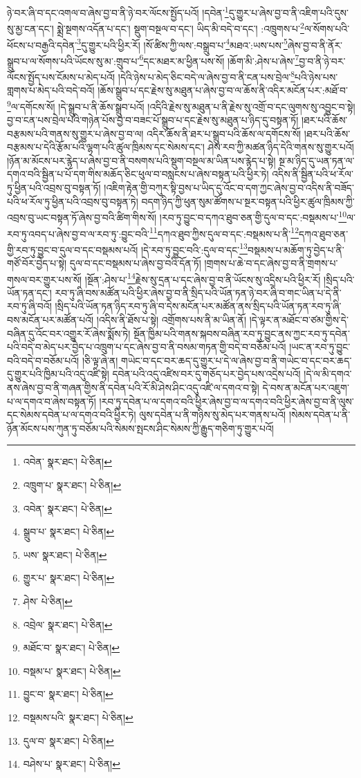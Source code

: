 ཉེ་བར་ཞི་བ་དང་འགལ་བ་ཞེས་བྱ་བ་ནི་ཉེ་བར་ལོངས་སྤྱོད་པའོ། །དབེན་\footnote{འབེན་  སྣར་ཐང་།  པེ་ཅིན། }དུ་གྱུར་པ་ཞེས་བྱ་བ་ནི་འཇིག་པའི་དུས་སུ་མྱ་ངན་དང་། སྨྲེ་སྔགས་འདོན་པ་དང་། སྡུག་བསྔལ་བ་དང་། ཡིད་མི་བདེ་བ་དང་། :འཁྲུགས་པ་\footnote{འཁྲུག་པ་  སྣར་ཐང་།  པེ་ཅིན། }ལ་སོགས་པའི་ཕོངས་པ་བརྒྱའི་དབེན་\footnote{འབེན་  སྣར་ཐང་།  པེ་ཅིན། }དུ་གྱུར་པའི་ཕྱིར་རོ། །སོ་ཚིས་ཀྱི་ལས་:བསྒྲུབ་པ་\footnote{སྒྲུབ་པ་  སྣར་ཐང་།  པེ་ཅིན། }མཐའ་:ཡས་པས་\footnote{ཡས་  སྣར་ཐང་།  པེ་ཅིན། }ཞེས་བྱ་བ་ནི་ནོར་སྒྲུབ་པ་ལ་སོགས་པའི་ཡོངས་སུ་མ་:གྲུབ་པ་\footnote{གྱུར་པ་  སྣར་ཐང་།  པེ་ཅིན། }དང་མཐར་མ་ཕྱིན་པས་སོ། །ཆོག་མི་:ཤེས་པ་ཞེས་\footnote{ཤེས་  པེ་ཅིན། }བྱ་བ་ནི་ཉེ་བར་ལོངས་སྤྱོད་པས་ངོམས་པ་མེད་པའོ། །དེའི་ཉེས་པ་མེད་ཅིང་བདེ་ལ་ཞེས་བྱ་བ་ནི་ངན་པས་བྲེལ་\footnote{འབྲེལ་  སྣར་ཐང་།  པེ་ཅིན། }པའི་ཉེས་པས་གླགས་པ་མེད་པའི་བདེ་བའོ། །ཆོས་སྒྲུབ་པ་དང་རྗེས་སུ་མཐུན་པ་ཞེས་བྱ་བ་ལ་ཆོས་ནི་འདིར་མངོན་པར་:མཐོ་བ་\footnote{མཐོང་བ་  སྣར་ཐང་།  པེ་ཅིན། }ལ་དགོངས་སོ། །དེ་སྒྲུབ་པ་ནི་ཆོས་སྒྲུབ་པའོ། །འདིའི་རྗེས་སུ་མཐུན་པ་ནི་རྗེས་སུ་འགྲོ་བ་དང་ལུགས་སུ་འབྱུང་བ་སྟེ། བྱ་བ་ངན་པས་བྲེལ་པའི་གཉེན་པོས་བྱ་བ་བཟང་པོ་སྒྲུབ་པ་དང་རྗེས་སུ་མཐུན་པ་ཉིད་དུ་བསྟན་ཏོ། །ཐར་པའི་ཆོས་བརྩམས་པའི་གནས་སུ་གྱུར་པ་ཞེས་བྱ་བ་ལ། འདིར་ཆོས་ནི་ཐར་པ་སྒྲུབ་པའི་ཆོས་ལ་དགོངས་སོ། །ཐར་པའི་ཆོས་བརྩམས་པ་དེའི་རྩོམ་པའི་ལྷག་པའི་ཚུལ་ཁྲིམས་དང་སེམས་དང་། ཤེས་རབ་ཀྱི་མཚན་ཉིད་དེའི་གནས་སུ་གྱུར་པའོ། །ཉོན་མ་མོངས་པར་རྙེད་པ་ཞེས་བྱ་བ་ནི་བསགས་པའི་སྡུག་བསྔལ་མ་ཡིན་པས་རྙེད་པ་སྟེ། སྔ་མ་ཉིད་དུ་ཡན་ཏན་ལ་དགའ་བའི་སྦྱིན་པ་པོ་དག་གིས་མཆོད་ཅིང་ཕུལ་བ་བསླངས་པ་ཞེས་བསྟན་པའི་ཕྱིར་ཏེ། འདིས་ནི་སྦྱིན་པའི་ཕ་རོལ་ཏུ་ཕྱིན་པའི་འབྲས་བུ་བསྟན་ཏོ། །འཇིག་རྟེན་གྱི་བཀུར་སྟི་བྱས་པ་ཡིད་དུ་འོང་བ་དག་ཀྱང་ཞེས་བྱ་བ་འདིས་ནི་བཟོད་པའི་ཕ་རོལ་ཏུ་ཕྱིན་པའི་འབྲས་བུ་བསྟན་ཏེ། བདག་ཉིད་ཀྱི་ཕུན་སུམ་ཚོགས་པ་སྔར་བསྟན་པའི་ཕྱིར་ཚུལ་ཁྲིམས་ཀྱི་འབྲས་བུ་ཡང་བསྟན་ཏོ་ཞེས་བྱ་བའི་ཚིག་གིས་སོ། །རབ་ཏུ་བྱུང་བ་དཀའ་ཐུབ་ཅན་གྱི་དུལ་བ་དང་:བསྡམས་པ་\footnote{བསྡམ་པ་  སྣར་ཐང་།  པེ་ཅིན། }ལ་རབ་ཏུ་འབད་པ་ཞེས་བྱ་བ་ལ་རབ་ཏུ་:བྱུང་བའི་\footnote{བྱུང་བ་  སྣར་ཐང་།  པེ་ཅིན། }དཀའ་ཐུབ་ཀྱིས་དུལ་བ་དང་:བསྡམས་པ་ནི་\footnote{བསྡམས་པའི་  སྣར་ཐང་།  པེ་ཅིན། }དཀའ་ཐུབ་ཅན་གྱི་རབ་ཏུ་བྱུང་བ་དུལ་བ་དང་བསྡམས་པའོ། །དེ་རབ་ཏུ་བྱུང་བའི་:དུལ་བ་དང་\footnote{དུལ་བ་  སྣར་ཐང་།  པེ་ཅིན། }བསྡམས་པ་མཆོག་ཏུ་བྱེད་པ་ནི་གཙོ་བོར་བྱེད་པ་སྟེ། དུལ་བ་དང་བསྡམས་པ་ཞེས་བྱ་བའི་དོན་ཏོ། །གྲགས་པ་ཆེ་བ་དང་ཞེས་བྱ་བ་ནི་གྲགས་པ་གསལ་བར་གྱུར་པས་སོ། །སྔོན་:ཤེས་པ་\footnote{བཤེས་པ་  སྣར་ཐང་།  པེ་ཅིན། }རྗེས་སུ་དྲན་པ་དང་ཞེས་བྱ་བ་ནི་ཡོངས་སུ་འདྲིས་པའི་ཕྱིར་རོ། །སྲིད་པའི་ཡོན་ཏན་དང་། རབ་ཏུ་ཞི་བས་མཚོན་པའི་ཕྱིར་ཞེས་བྱ་བ་ནི་སྲིད་པའི་ཡོན་ཏན་ཉེ་བར་ཞི་བ་གང་ཡིན་པ་དེ་ནི་རབ་ཏུ་ཞི་བའོ། །སྲིད་པའི་ཡོན་ཏན་ཉིད་རབ་ཏུ་ཞི་བ་དེས་མངོན་པར་མཚོན་ནས་སྲིད་པའི་ཡོན་ཏན་རབ་ཏུ་ཞི་བས་མངོན་པར་མཚོན་པའོ། །འདིས་ནི་ཐོས་པ་སྟེ། འགྲོགས་པས་ནི་མ་ཡིན་ནོ། །དེ་ལྟར་ན་མཐོང་བ་ཙམ་གྱིས་དེ་བཞིན་དུ་འོང་བར་འགྱུར་རོ་ཞེས་སྨོས་ཏེ། སྔོན་ཁྱིམ་པའི་གནས་སྐབས་བཞིན་རབ་ཏུ་བྱུང་ནས་ཀྱང་རབ་ཏུ་དབེན་པའི་བདེ་བ་མེད་པར་བྱེད་པ་འཁྲུག་པ་དང་ཞེས་བྱ་བ་ནི་བསམ་གཏན་གྱི་བདེ་བ་བཅོམ་པའོ། །ཡང་ན་རབ་ཏུ་བྱུང་བའི་བདེ་བ་བཅོམ་པའོ། །ཅི་ལྟ་ཞེ་ན། གཡེང་བ་དང་བར་ཆད་དུ་གྱུར་པ་དེ་ལ་ཞེས་བྱ་བ་ནི་གཡེང་བ་དང་བར་ཆད་དུ་གྱུར་པའི་ཁྱིམ་པའི་འདུ་འཛི་སྟེ། དབེན་པའི་འདུ་འཛིས་བར་དུ་གཅོད་པར་བྱེད་པས་འདྲེས་པའོ། །དེ་ལ་མི་དགའ་ནས་ཞེས་བྱ་བ་ནི་གཞན་གྱིས་ནི་དབེན་པའི་རོ་མི་ཤེས་ཤིང་འདུ་འཛི་ལ་དགའ་བ་སྟེ། དེ་བས་ན་མངོན་པར་འཇུག་པ་ལ་དགའ་བ་ཞེས་བསྟན་ཏོ། །རབ་ཏུ་དབེན་པ་ལ་དགའ་བའི་ཕྱིར་ཞེས་བྱ་བ་ལ་དགའ་བའི་ཕྱིར་ཞེས་བྱ་བ་ནི་ལུས་དང་སེམས་དབེན་པ་ལ་དགའ་བའི་ཕྱིར་ཏེ། ལུས་དབེན་པ་ནི་གཉིས་སུ་མེད་པར་གནས་པའོ། །སེམས་དབེན་པ་ནི་ཉོན་མོངས་པས་ཀུན་ཏུ་བཅོམ་པའི་སེམས་སྤངས་ཤིང་སེམས་ཀྱི་རྒྱུད་གཅིག་ཏུ་གྱུར་པའོ། 